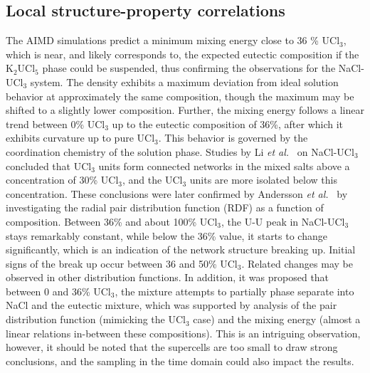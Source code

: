\documentclass[preprint,3p,10pt,number,sort&compress]{elsarticle}
\begin{document}
\subsection{Local structure-property correlations}
The AIMD simulations predict a minimum mixing energy close to 36 \% UCl$_3$, which is near, and likely corresponds to, the expected eutectic composition if the K$_2$UCl$_5$ phase could be suspended, thus confirming the observations for the NaCl-UCl$_3$ system. The density exhibits a maximum deviation from ideal solution behavior at approximately the same composition, though the maximum may be shifted to a slightly lower composition. Further, the mixing energy follows a linear trend between 0\% UCl$_3$ up to the eutectic composition of 36\%, after which it exhibits curvature up to pure UCl$_3$. This behavior is governed by the coordination chemistry of the solution phase. Studies by Li \textit{et al.}~\cite{Li} on NaCl-UCl$_3$ concluded that UCl$_3$ units form connected networks in the mixed salts above a concentration of 30\% UCl$_3$, and the UCl$_3$ units are more isolated below this concentration. These conclusions were later confirmed by Andersson \textit{et al.}~\cite{Andersson} by investigating the radial pair distribution function (RDF) as a function of composition. Between 36\% and about 100\% UCl$_3$, the U-U peak in NaCl-UCl$_3$ stays remarkably constant, while below the 36\% value, it starts to change significantly, which is an indication of the network structure breaking up. Initial signs of the break up occur between 36 and 50\% UCl$_3$. Related changes may be observed in other distribution functions. In addition, it was proposed that between 0 and 36\% UCl$_3$, the mixture attempts to partially phase separate into NaCl and the eutectic mixture, which was supported by analysis of the pair distribution function (mimicking the UCl$_3$ case) and the mixing energy (almost a linear relations in-between these compositions). This is an intriguing observation, however, it should be noted that the supercells are too small to draw strong conclusions, and the sampling in the time domain could also impact the results. 
\end{document}

